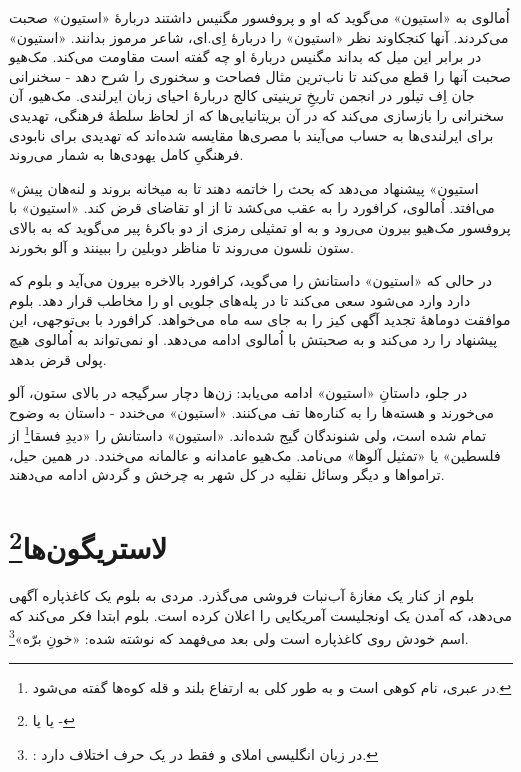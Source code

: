 \documentclass[12pt]{book}
\newcommand{\noun}[1]{«{#1}»}
\begin{document}
    اُمالوی به \noun{استیون} می‌گوید که او و پروفسور مگنیس داشتند دربارۀ \noun{استیون} صحبت می‌کردند. آنها کنجکاوند نظر \noun{استیون} را دربارۀ اِی.ای، شاعر مرموز بدانند. \noun{استیون} در برابر این میل که بداند مگنیس دربارۀ او چه گفته است مقاومت می‌کند. مک‌هیو صحبت آنها را قطع می‌کند تا ناب‌ترین مثال فصاحت و سخنوری را شرح دهد - سخنرانی جان اِف تیلور در انجمن تاریخِ ترینیتی کالج  دربارۀ احیای زبان ایرلندی. مک‌هیو، آن سخنرانی را بازسازی می‌کند که در آن بریتانیایی‌ها که از لحاظ سلطۀ فرهنگی، تهدیدی برای ایرلندی‌ها به حساب می‌آیند با مصری‌ها مقایسه شده‌اند که تهدیدی برای نابودی فرهنگیِ کامل یهودی‌ها به شمار می‌روند.

    \noun{استیون} پیشنهاد می‌دهد که بحث را خاتمه دهند تا به میخانه بروند و لنه‌هان پیش می‌افتد. اُمالوی، کرافورد را به عقب می‌کشد تا از او تقاضای قرض کند. \noun{استیون} با پروفسور مک‌هیو بیرون می‌رود و به او تمثیلی رمزی از دو باکرۀ پیر می‌گوید که به بالای ستون نلسون می‌روند تا مناظر دوبلین را ببینند و آلو بخورند.

    در حالی که \noun{استیون} داستانش را می‌گوید، کرافورد بالاخره بیرون می‌آید و بلوم که دارد وارد می‌شود سعی می‌کند تا در پله‌های جلویی او را مخاطب قرار دهد. بلوم موافقت دوماهۀ تجدید آگهی کیز را به جای سه ماه می‌خواهد. کرافورد با بی‌توجهی، این پیشنهاد را رد می‌کند و به صحبتش با اُمالوی ادامه می‌دهد. او نمی‌تواند به اُمالوی هیچ پولی قرض بدهد.

    در جلو، داستانِ \noun{استیون} ادامه می‌یابد: زن‌ها دچار سرگیجه در بالای ستون، آلو می‌خورند و هسته‌ها را به کناره‌ها تف می‌کنند. \noun{استیون} می‌خندد - داستان به وضوح تمام شده است، ولی شنوندگان گیج شده‌اند. \noun{استیون} داستانش را «دیدِ فسقا\footnote{در عبری، نام کوهی است و به طور کلی به ارتفاع بلند و قله کوه‌ها گفته می‌شود.} از فلسطین» یا «تمثیل آلوها» می‌نامد. مک‌هیو عامدانه و عالمانه می‌خندد. در همین حیل، ترامواها و دیگر وسائل نقلیه در کل شهر به چرخش و گردش ادامه می‌دهند.

    \chapter[لاستریگون‌ها]{لاستریگون‌ها\protect\footnote{ یا  یا -}}\label{ep:8}
    بلوم از کنار یک مغازۀ آب‌نبات فروشی می‌گذرد. مردی به بلوم یک کاغذپاره آگهی می‌دهد، که آمدن یک اونجلیست آمریکایی را اعلان کرده است. بلوم ابتدا فکر می‌کند که اسم خودش روی کاغذپاره است ولی بعد می‌فهمد که نوشته شده: «خونِ برّه»\footnote{: در زبان انگلیسی املای  و  فقط در یک حرف اختلاف دارد.}.
\end{document}
